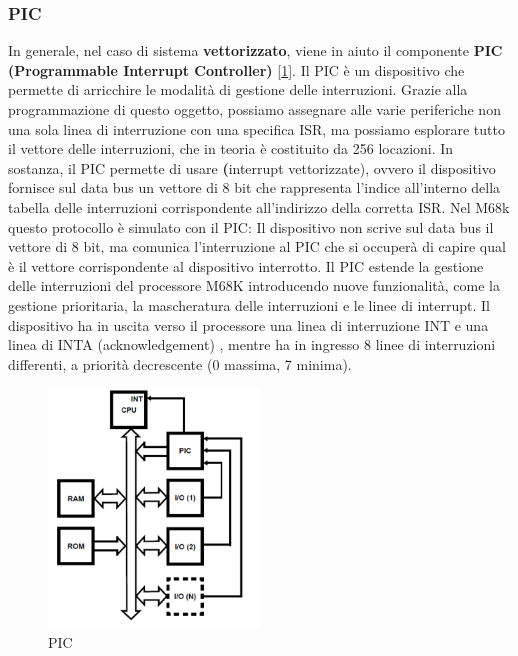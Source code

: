 \subsubsection{PIC} \label{par:PIC}
In generale, nel caso di sistema \textbf{vettorizzato}, viene in aiuto il componente \textbf{PIC (Programmable Interrupt Controller)} [\ref{img:PIC}].
Il PIC è un dispositivo che permette di arricchire le
modalità di gestione delle interruzioni. Grazie alla programmazione di questo oggetto, possiamo assegnare alle varie periferiche non una sola linea di interruzione con una specifica ISR, ma possiamo esplorare tutto il vettore delle interruzioni, che in teoria è costituito da 256 locazioni. In sostanza, il PIC permette di usare \textbf(interrupt vettorizzate), ovvero il dispositivo fornisce sul data bus un vettore di 8 bit che rappresenta l’indice all’interno della tabella delle interruzioni corrispondente all’indirizzo della corretta ISR. Nel M68k questo protocollo è simulato con il PIC: Il dispositivo non scrive sul data bus il vettore di 8 bit, ma comunica l’interruzione al PIC che si occuperà di capire qual è il vettore corrispondente al dispositivo interrotto. Il PIC estende la gestione delle interruzioni del processore M68K introducendo nuove funzionalità, come la gestione prioritaria, la mascheratura delle interruzioni e le linee di interrupt. Il dispositivo ha in uscita verso il processore una linea di interruzione INT e una linea di INTA (acknowledgement) , mentre ha in ingresso 8 linee di interruzioni differenti, a priorità decrescente (0 massima, 7 minima).

\begin{figure} [ht]
    \centering
    \includegraphics[width=0.5\textwidth]{img/PIC3.png}
    \caption{PIC}\label{img:PIC}
\end{figure}

